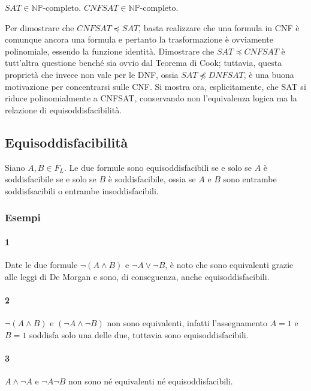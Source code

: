 \begin{teo}
        $SAT \in \mathbb{NP}$-completo. $CNFSAT \in \mathbb{NP}$-completo. 
\end{teo}

Per dimostrare che $CNFSAT \preceq SAT$, basta realizzare che una formula 
in CNF è comunque ancora una formula e pertanto la trasformazione è ovviamente 
polinomiale, essendo la funzione identità. Dimostrare che $SAT \preceq CNFSAT$ 
è tutt'altra questione benché sia ovvio dal Teorema di Cook; tuttavia, questa 
proprietà che invece non vale per le DNF, ossia $SAT \npreceq DNFSAT$, è una 
buona motivazione per concentrarsi sulle CNF. 
Si mostra ora, esplicitamente, che SAT si riduce polinomialmente a CNFSAT, 
conservando non l'equivalenza logica ma la relazione di equisoddisfacibilità. 

\subsection{Equisoddisfacibilità}
\begin{defi}[Equisoddisfacibilità]
        Siano $A, B \in F_L$. Le due formule sono equisoddisfacibili se e solo 
        se $A$ è soddisfacibile se e solo se $B$ è soddisfacibile, ossia 
        se $A$ e $B$ sono entrambe soddisfsacibili o entrambe insoddisfacibili. 
\end{defi}

\subsubsection{Esempi}
\paragraph{1}
Date le due formule $\neg (A \land B)$ e $\neg A \lor \neg B$, è noto 
che sono equivalenti grazie alle leggi di De Morgan e sono, di conseguenza, 
anche equisoddisfacibili.
\paragraph{2} $\neg (A \land B)$ e $(\neg A \land \neg B)$ non sono equivalenti, 
infatti l'assegnamento $A=1$ e $B=1$ soddisfa solo una delle due, tuttavia 
sono equisoddisfacibili.
\paragraph{3} $A \land \neg A$ e $\neg A \neg B$ non sono né equivalenti né
equisoddisfacibili.

